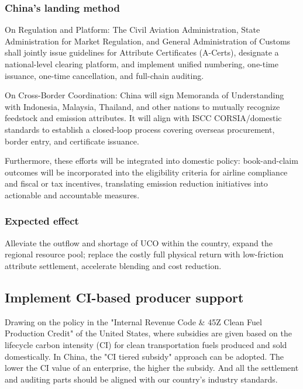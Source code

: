 \documentclass[a4paper,11pt]{article}
\begin{document}
\subsubsection{China's landing method}
On Regulation and Platform: The Civil Aviation Administration, State Administration for Market Regulation, and General Administration of Customs shall jointly issue guidelines for Attribute Certificates (A-Certs), designate a national-level clearing platform, and implement unified numbering, one-time issuance, one-time cancellation, and full-chain auditing.

On Cross-Border Coordination: China will sign Memoranda of Understanding with Indonesia, Malaysia, Thailand, and other nations to mutually recognize feedstock and emission attributes. It will align with ISCC CORSIA/domestic standards to establish a closed-loop process covering overseas procurement, border entry, and certificate issuance.

Furthermore, these efforts will be integrated into domestic policy: book-and-claim outcomes will be incorporated into the eligibility criteria for airline compliance and fiscal or tax incentives, translating emission reduction initiatives into actionable and accountable measures.

\subsubsection{Expected effect}
Alleviate the outflow and shortage of UCO within the country, expand the regional resource pool; replace the costly full physical return with low-friction attribute settlement, accelerate blending and cost reduction.

\subsection{Implement CI-based producer support}
Drawing on the policy in the "Internal Revenue Code \& 45Z Clean Fuel Production Credit" of the United States, where subsidies are given based on the lifecycle carbon intensity (CI) for clean transportation fuels produced and sold domestically. In China, the "CI tiered subsidy" approach can be adopted. The lower the CI value of an enterprise, the higher the subsidy. And all the settlement and auditing parts should be aligned with our country's industry standards.
\end{document}
